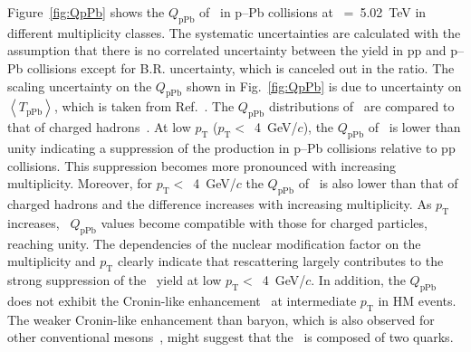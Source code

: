 Figure~\ref{fig:QpPb} shows the $Q_{\mbox{pPb}}$ of \fzero~in p--Pb collisions at \snn~=~5.02~TeV in different multiplicity classes. The systematic uncertainties are calculated with the assumption that there is no correlated uncertainty between the yield in pp and p--Pb collisions except for B.R. uncertainty, which is canceled out in the ratio. The scaling uncertainty on the $Q_{\mbox{pPb}}$ shown in Fig.~\ref{fig:QpPb} is due to uncertainty on $\left\langle T_{\mathrm{pPb}} \right\rangle$, which is taken from Ref.~\cite{ALICE:2014xsp}. The $Q_{\mbox{pPb}}$ distributions of \fzero~are compared to that of charged hadrons~\cite{ALICE:2014xsp}. At low $p_{\mathrm{T}}$ ($p_{\mathrm{T}}<$~4~GeV/$c$), the $Q_{\mbox{pPb}}$ of \fzero~is lower than unity indicating a suppression of the production in p--Pb collisions relative to pp collisions. This suppression becomes more pronounced with increasing multiplicity. Moreover, for $p_{\mathrm{T}}<$~4~GeV/$c$ the $Q_{\mbox{pPb}}$ of \fzero~is also lower than that of charged hadrons and the difference increases with increasing multiplicity. As $p_{\mathrm{T}}$ increases, \fzero~$Q_{\mbox{pPb}}$ values become compatible with those for charged particles, reaching unity. The dependencies of the nuclear modification factor on the multiplicity and $p_{\mathrm{T}}$ clearly indicate that rescattering largely contributes to the strong suppression of the \fzero~yield at low $p_{\mathrm{T}}<$~4~GeV/$c$. In addition, the $Q_{\mbox{pPb}}$ does not exhibit the Cronin-like enhancement~\cite{Cronin:1974zm} at intermediate $p_{\mathrm{T}}$ in HM events. The weaker Cronin-like enhancement than baryon, which is also observed for other conventional mesons~\cite{ALICE:2016dei, ALICE:2016sak}, might suggest that the \fzero~is composed of two quarks.